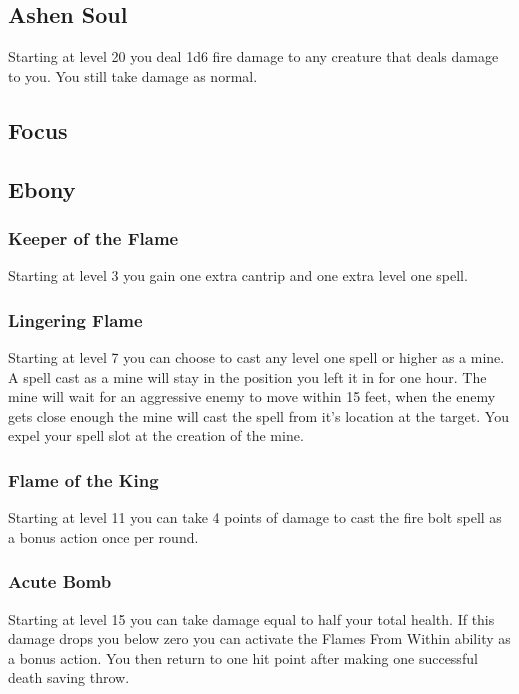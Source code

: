 \subsection{Ashen Soul}

Starting at level 20 you deal 1d6 fire damage to any creature that deals damage to you. You still take damage as normal.

\subsection{Focus}

\subsection{Ebony}

\subsubsection{Keeper of the Flame}

Starting at level 3 you gain one extra cantrip and one extra level one spell.

\subsubsection{Lingering Flame}

Starting at level 7 you can choose to cast any level one spell or higher as a mine. A spell cast as a mine will stay in the position you left it in for one hour. The mine will wait for an aggressive enemy to move within 15 feet, when the enemy gets close enough the mine will cast the spell from it's location at the target. You expel your spell slot at the creation of the mine.

\subsubsection{Flame of the King}

Starting at level 11 you can take 4 points of damage to cast the fire bolt spell as a bonus action once per round.

\subsubsection{Acute Bomb}

Starting at level 15 you can take damage equal to half your total health. If this damage drops you below zero you can activate the Flames From Within ability as a bonus action. You then return to one hit point after making one successful death saving throw.

